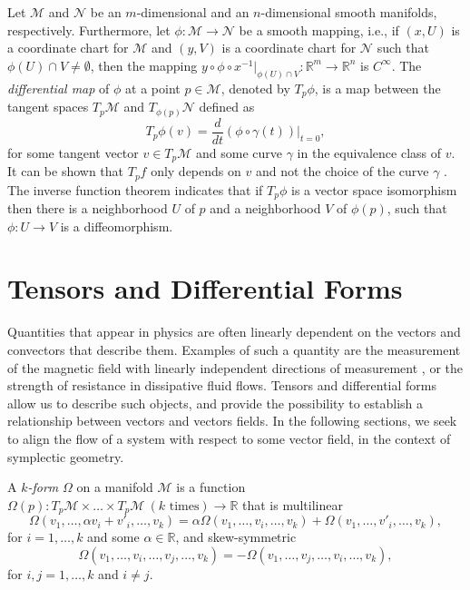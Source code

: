 Let $\mathcal M$ and $\mathcal N$ be an $m$-dimensional and an $n$-dimensional smooth manifolds, respectively. Furthermore, let $\phi:\mathcal M\to \mathcal N$ be a smooth mapping, i.e., if $(x,U)$ is a coordinate chart for $\mathcal M$ and $(y,V)$ is a coordinate chart for $\mathcal N$ such that $\phi(U)\cap V\neq \emptyset$, then the mapping $y\circ \phi \circ x^{-1}|_{\phi(U)\cap V}:\mathbb R^{m}\to \mathbb R^{n}$ is $C^{\infty}$. The \emph{differential map} of $\phi$ at a point $p\in \mathcal M$, denoted by $T_{p}\phi$, is a map between the tangent spaces $T_p \mathcal M$ and $T_{\phi(p)} \mathcal N$ defined as
\begin{equation} \label{eq:2.4}
	T_p \phi(v) = \frac{d}{dt}(\phi\circ \gamma(t))|_{t=0},
\end{equation}
for some tangent vector $v\in T_{p} \mathcal M$ and some curve $\gamma$ in the equivalence class of $v$. It can be shown that $T_p f$ only depends on $v$ and not the choice of the curve $\gamma$ \cite{robbin2011introduction}. The inverse function theorem \cite{rudin1976principles} indicates that if $T_p\phi$ is a vector space isomorphism then there is a neighborhood $U$ of $p$ and a neighborhood $V$ of $\phi(p)$, such that $\phi:U\to V$ is a diffeomorphism.

\section{Tensors and Differential Forms} \label{section:2.2}
Quantities that appear in physics are often linearly dependent on the vectors and convectors that describe them. Examples of such a quantity are the measurement of the magnetic field with linearly independent directions of measurement \cite{Wald:106274}, or the strength of resistance in dissipative fluid flows. Tensors and differential forms allow us to describe such objects, and provide the possibility to establish a relationship between vectors and vectors fields. In the following sections, we seek to align the flow of a system with respect to some vector field, in the context of symplectic geometry. 

\begin{definition}
A \emph{$k$-form} $\Omega$ on a manifold $\mathcal M$ is a function $\Omega(p): T_p\mathcal M \times \dots \times T_p\mathcal M \ (k \text{ times}) \to \mathbb R$ that is multilinear
\[
	\Omega(v_1,\dots,\alpha v_i + v'_i, \dots, v_k) = \alpha \Omega(v_1,\dots,v_i, \dots, v_k) + \Omega(v_1,\dots,v'_i, \dots, v_k),
\]
for $i=1,\dots,k$ and some $\alpha \in \mathbb R$, and skew-symmetric
\[
	\Omega(v_1,\dots,v_i,\dots,v_j, \dots, v_k) = - \Omega(v_1,\dots,v_j,\dots,v_i, \dots, v_k),
\]
for $i,j=1,\dots,k$ and $i\neq j$.
\end{definition}

